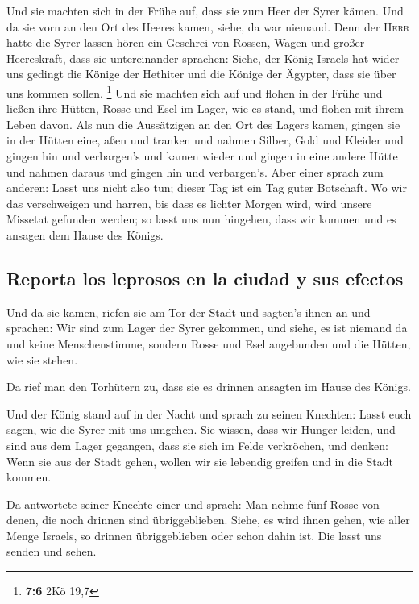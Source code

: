  Und sie machten sich in der Frühe auf, dass sie zum Heer
der Syrer kämen. Und da sie vorn an den Ort des Heeres kamen, siehe, da
war niemand.  Denn der \textsc{Herr} hatte die Syrer
lassen hören ein Geschrei von Rossen, Wagen und großer Heereskraft, dass
sie untereinander sprachen: Siehe, der König Israels hat wider uns
gedingt die Könige der Hethiter und die Könige der Ägypter, dass sie
über uns kommen sollen. \footnote{\textbf{7:6} 2Kö 19,7} 
Und sie machten sich auf und flohen in der Frühe und ließen ihre Hütten,
Rosse und Esel im Lager, wie es stand, und flohen mit ihrem Leben davon.
 Als nun die Aussätzigen an den Ort des Lagers kamen,
gingen sie in der Hütten eine, aßen und tranken und nahmen Silber, Gold
und Kleider und gingen hin und verbargen's und kamen wieder und gingen
in eine andere Hütte und nahmen daraus und gingen hin und verbargen's.
 Aber einer sprach zum anderen: Lasst uns nicht also tun;
dieser Tag ist ein Tag guter Botschaft. Wo wir das verschweigen und
harren, bis dass es lichter Morgen wird, wird unsere Missetat gefunden
werden; so lasst uns nun hingehen, dass wir kommen und es ansagen dem
Hause des Königs.

\hypertarget{reporta-los-leprosos-en-la-ciudad-y-sus-efectos}{%
\subsection{Reporta los leprosos en la ciudad y sus
efectos}\label{reporta-los-leprosos-en-la-ciudad-y-sus-efectos}}

 Und da sie kamen, riefen sie am Tor der Stadt und
sagten's ihnen an und sprachen: Wir sind zum Lager der Syrer gekommen,
und siehe, es ist niemand da und keine Menschenstimme, sondern Rosse und
Esel angebunden und die Hütten, wie sie stehen.

 Da rief man den Torhütern zu, dass sie es drinnen
ansagten im Hause des Königs.

 Und der König stand auf in der Nacht und sprach zu
seinen Knechten: Lasst euch sagen, wie die Syrer mit uns umgehen. Sie
wissen, dass wir Hunger leiden, und sind aus dem Lager gegangen, dass
sie sich im Felde verkröchen, und denken: Wenn sie aus der Stadt gehen,
wollen wir sie lebendig greifen und in die Stadt kommen.

 Da antwortete seiner Knechte einer und sprach: Man nehme
fünf Rosse von denen, die noch drinnen sind übriggeblieben. Siehe, es
wird ihnen gehen, wie aller Menge Israels, so drinnen übriggeblieben
oder schon dahin ist. Die lasst uns senden und sehen.

